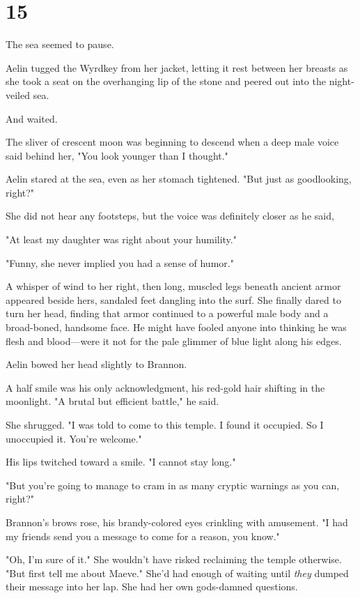
\chapter{15}

The sea seemed to pause.

Aelin tugged the Wyrdkey from her jacket, letting it rest between her breasts as she took a seat on the overhanging lip of the stone and peered out into the night-veiled sea.

And waited.

The sliver of crescent moon was beginning to descend when a deep male voice said behind her, "You look younger than I thought."

Aelin stared at the sea, even as her stomach tightened. "But just as goodlooking, right?"

She did not hear any footsteps, but the voice was definitely closer as he said,

"At least my daughter was right about your humility."

"Funny, she never implied you had a sense of humor."

A whisper of wind to her right, then long, muscled legs beneath ancient armor appeared beside hers, sandaled feet dangling into the surf. She finally dared to turn her head, finding that armor continued to a powerful male body and a broad-boned, handsome face. He might have fooled anyone into thinking he was flesh and blood---were it not for the pale glimmer of blue light along his edges.

Aelin bowed her head slightly to Brannon.

A half smile was his only acknowledgment, his red-gold hair shifting in the moonlight. "A brutal but efficient battle," he said.

She shrugged. "I was told to come to this temple. I found it occupied. So I unoccupied it. You're welcome."

His lips twitched toward a smile. "I cannot stay long."

"But you're going to manage to cram in as many cryptic warnings as you can, right?"

Brannon's brows rose, his brandy-colored eyes crinkling with amusement. "I had my friends send you a message to come for a reason, you know."

"Oh, I'm sure of it." She wouldn't have risked reclaiming the temple otherwise. "But first tell me about Maeve." She'd had enough of waiting until \emph{they} dumped their message into her lap. She had her own gods-damned questions.

